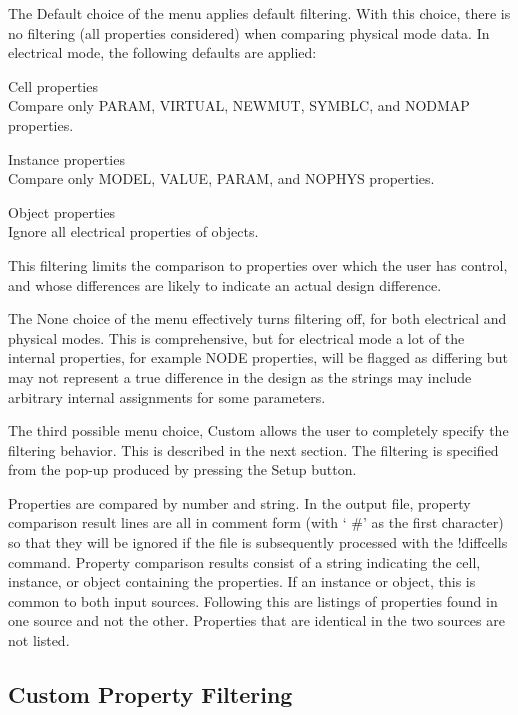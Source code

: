 The {\cb Default} choice of the menu applies default filtering.  With
this choice, there is no filtering (all properties considered) when
comparing physical mode data.  In electrical mode, the following
defaults are applied:

\begin{description}
\item{Cell properties}\\
Compare only PARAM, VIRTUAL, NEWMUT, SYMBLC, and NODMAP properties.
\item{Instance properties}\\
Compare only MODEL, VALUE, PARAM, and NOPHYS properties.
\item{Object properties}\\
Ignore all electrical properties of objects.
\end{description}

This filtering limits the comparison to properties over which the user
has control, and whose differences are likely to indicate an actual design
difference.

The {\cb None} choice of the menu effectively turns filtering off, for
both electrical and physical modes.  This is comprehensive, but for
electrical mode a lot of the internal properties, for example NODE
properties, will be flagged as differing but may not represent a true
difference in the design as the strings may include arbitrary internal
assignments for some parameters.

The third possible menu choice, {\cb Custom} allows the user to
completely specify the filtering behavior.  This is described in the
next section.  The filtering is specified from the pop-up produced by
pressing the {\cb Setup} button.

Properties are compared by number and string.  In the output file,
property comparison result lines are all in comment form (with `{\vt
\#}' as the first character) so that they will be ignored if the file
is subsequently processed with the {\cb !diffcells} command.  Property
comparison results consist of a string indicating the cell, instance,
or object containing the properties.  If an instance or object, this
is common to both input sources.  Following this are listings of
properties found in one source and not the other.  Properties that are
identical in the two sources are not listed.

\subsection{Custom Property Filtering}
\label{prpfilt}

